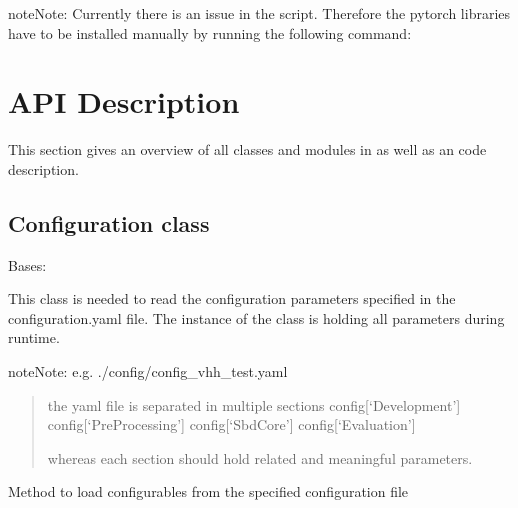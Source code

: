 \documentclass[letterpaper,10pt,english,openany,oneside]{sphinxmanual}
\begin{document}
\begin{sphinxadmonition}{note}{Note:}
Currently there is an issue in the  script. Therefore the pytorch libraries have to be installed manually by running the following command:
\end{sphinxadmonition}


\chapter{API Description}
\label{\detokenize{index:api-description}}
This section gives an overview of all classes and modules in  as well as an code description.


\section{Configuration class}
\label{\detokenize{Configuration:configuration-class}}\label{\detokenize{Configuration::doc}}

\begin{fulllineitems}
\label{\detokenize{Configuration:sbd.Configuration.Configuration}}
Bases: 

This class is needed to read the configuration parameters specified in the configuration.yaml file.
The instance of the class is holding all parameters during runtime.

\begin{sphinxadmonition}{note}{Note:}
e.g. ./config/config\_vhh\_test.yaml
\begin{quote}

the yaml file is separated in multiple sections
config{[}‘Development’{]}
config{[}‘PreProcessing’{]}
config{[}‘SbdCore’{]}
config{[}‘Evaluation’{]}

whereas each section should hold related and meaningful parameters.
\end{quote}
\end{sphinxadmonition}

\begin{fulllineitems}
\label{\detokenize{Configuration:sbd.Configuration.Configuration.loadConfig}}
Method to load configurables from the specified configuration file

\end{fulllineitems}


\end{fulllineitems}
\end{document}
